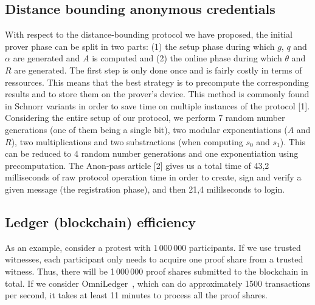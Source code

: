\subsection{Distance bounding anonymous credentials}
With respect to the distance-bounding protocol we have proposed, the initial prover phase can be split in two parts: (1) the setup phase during which $g$, $q$ and $\alpha$ are generated and $A$ is computed and (2) the online phase during which $\theta$ and $R$ are generated. The first step is only done once and is fairly costly in terms of ressources. 
This means that the best strategy is to precompute the corresponding results and to store them on the prover's device. 
This method is commonly found in Schnorr variants in order to save time on multiple instances of the protocol [1].
Considering the entire setup of our protocol, we perform 7 random number generations (one of them being a single bit), two modular exponentiations ($A$ and $R$), two multiplications and two substractions (when computing $s_0$ and $s_1$). 
This can be reduced to 4 random number generations and one exponentiation using precomputation. The Anon-pass article [2] gives us a total time of 43,2 milliseconds of raw protocol operation time in order to create, sign and verify a given message (the registration phase), and then 21,4 mililseconds to login.


\subsection{Ledger (blockchain) efficiency}
As an example, consider a protest with 1\,000\,000 participants.
If we use trusted witnesses, each participant only needs to acquire one proof share from a trusted witness.
Thus, there will be 1\,000\,000 proof shares submitted to the blockchain in total.
If we consider OmniLedger~\cite{OmniLedger}, which can do approximately 1500 transactions per second, it takes at least 11 minutes to process all the proof shares.

